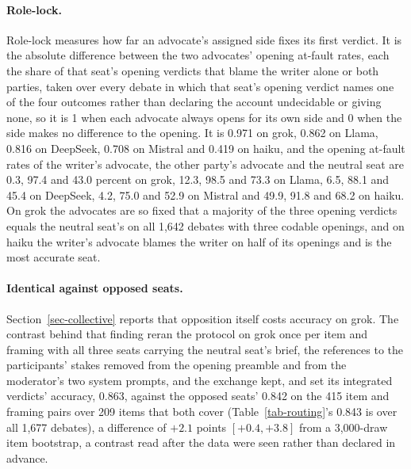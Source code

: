 \paragraph{Role-lock.}
Role-lock measures how far an advocate's assigned side fixes its first
verdict. It is the absolute difference between the two advocates' opening
at-fault rates, each the share of that seat's opening verdicts that blame the
writer alone or both parties, taken over every debate in which that seat's
opening verdict names one of the four outcomes rather than declaring the
account undecidable or giving none, so it is 1 when each advocate always
opens for its own side and 0 when the side makes no difference to the
opening. It is 0.971 on grok, 0.862 on Llama, 0.816 on DeepSeek, 0.708 on
Mistral and 0.419 on haiku, and the opening at-fault rates of the writer's
advocate, the other party's advocate and the neutral seat are 0.3, 97.4 and
43.0 percent on grok, 12.3, 98.5 and 73.3 on Llama, 6.5, 88.1 and 45.4 on
DeepSeek, 4.2, 75.0 and 52.9 on Mistral and 49.9, 91.8 and 68.2 on haiku. On
grok the advocates are so fixed that a majority of the three opening verdicts
equals the neutral seat's on all 1,642 debates with three codable openings,
and on haiku the writer's advocate blames the writer on half of its openings
and is the most accurate seat.

\paragraph{Identical against opposed seats.}
Section~\ref{sec-collective} reports that opposition itself costs accuracy on
grok. The contrast behind that finding reran the protocol on grok once per
item and framing with all three seats carrying the neutral seat's brief, the
references to the participants' stakes removed from the opening preamble and
from the moderator's two system prompts, and the exchange kept, and set its
integrated verdicts' accuracy, 0.863, against the opposed seats' 0.842 on the
415 item and framing pairs over 209 items that both cover
(Table~\ref{tab-routing}'s 0.843 is over all 1,677 debates), a difference of
$+2.1$ points $[+0.4, +3.8]$ from a 3,000-draw item bootstrap, a contrast read
after the data were seen rather than declared in advance.

